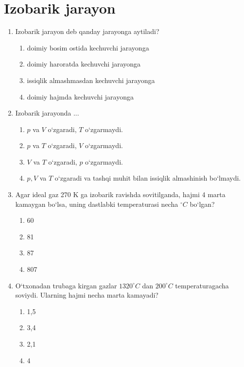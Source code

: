 
\section{Izobarik jarayon}

\begin{enumerate}

\item Izobarik jarayon deb qanday jarayonga aytiladi?
\begin{enumerate}[label=\Alph*)]
\item doimiy bosim ostida kechuvchi jarayonga
\item doimiy haroratda kechuvchi jarayonga
\item issiqlik almashmasdan kechuvchi jarayonga
\item doimiy hajmda kechuvchi jarayonga
\end{enumerate}

\item Izobarik jarayonda ...
\begin{enumerate}[label=\Alph*)]
\item $p$ va $V$ o‘zgaradi, $T$ o‘zgarmaydi.
\item $p$ va $T$ o‘zgaradi, $V$ o‘zgarmaydi.
\item $V$ va $T$ o‘zgaradi, $p$ o‘zgarmaydi.
\item $p, V$ va $T$ o‘zgaradi va tashqi muhit bilan issiqlik almashinish bo‘lmaydi.
\end{enumerate}

\item Agar ideal gaz 270 K ga izobarik ravishda sovitilganda, hajmi 4 marta kamaygan bo‘lsa, uning dastlabki temperaturasi necha $^\circ C$ bo‘lgan?
\begin{enumerate}[label=\Alph*)]
\item 60
\item 81
\item 87
\item 807
\end{enumerate}

\item O‘txonadan trubaga kirgan gazlar $1320^\circ C$ dan $200^\circ C$ temperaturagacha soviydi. Ularning hajmi necha marta kamayadi?
\begin{enumerate}[label=\Alph*)]
\item 1,5
\item 3,4
\item 2,1
\item 4
\end{enumerate}


\end{enumerate}
